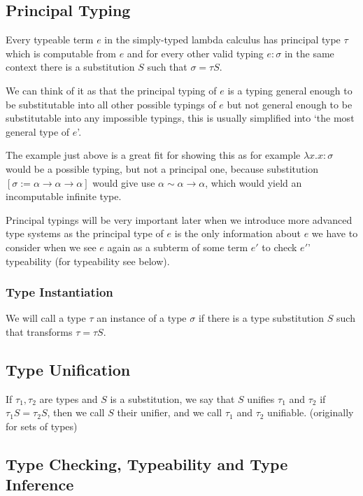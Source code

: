 \subsection{Principal Typing}

Every typeable term $e$ in the simply-typed lambda calculus has principal type $\tau$ \cite{barendregt1992lambda} which is computable from $e$ and for every other valid typing $e : \sigma$ in the same context there is a substitution $S$ such that $\sigma = \tau S$.

We can think of it as that the principal typing of $e$ is a typing general enough to be substitutable into all other possible typings of $e$ but not general enough to be substitutable into any impossible typings, this is usually simplified into `the most general type of $e$'.

The example just above is a great fit for showing this as for example $\lambda x . x : \sigma$ would be a possible typing, but not a principal one, because substitution $[\sigma := \alpha \rightarrow \alpha \rightarrow \alpha]$ would give use $\alpha \sim \alpha \rightarrow \alpha$, which would yield an incomputable infinite type.

Principal typings will be very important later when we introduce more advanced type systems as the principal type of $e$ is the only information about $e$ we have to consider when we see $e$ again as a subterm of some term $e'$ to check $e'$' typeability (for typeability see below). %

\subsubsection{Type Instantiation}

We will call a type $\tau$ an instance of a type $\sigma$ if there is a type substitution $S$ such that transforms $\tau = \tau S$.

\subsection{Type Unification}

If $\tau_1, \tau_2$ are types and $S$ is a substitution, we say that $S$ unifies $\tau_1$ and $\tau_2$ if $\tau_1 S = \tau_2 S$, then we call $S$ their unifier, and we call $\tau_1$ and $\tau_2$ unifiable. \cite{robinson1965machine} (originally for sets of types)

\subsection{Type Checking, Typeability and Type Inference}

